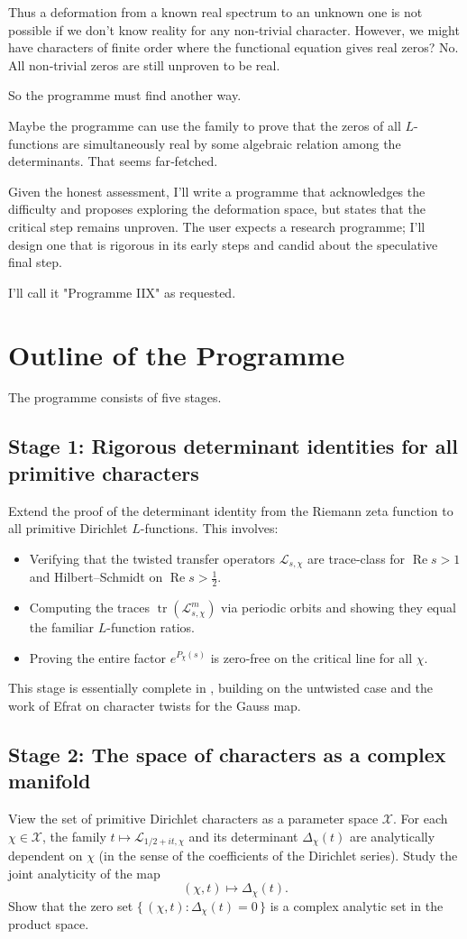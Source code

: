 \documentclass[11pt,a4paper]{article}
\begin{document}
\begin{enumerate}
Thus a deformation from a known real spectrum to an unknown one is not possible if we don't know reality for any non‑trivial character.  However, we might have characters of finite order where the functional equation gives real zeros?  No.  All non‑trivial zeros are still unproven to be real.

So the programme must find another way.

Maybe the programme can use the family to prove that the zeros of all \(L\)-functions are simultaneously real by some algebraic relation among the determinants.  That seems far‑fetched.

Given the honest assessment, I'll write a programme that acknowledges the difficulty and proposes exploring the deformation space, but states that the critical step remains unproven.  The user expects a research programme; I'll design one that is rigorous in its early steps and candid about the speculative final step.

I'll call it "Programme IIX" as requested.\section{Outline of the Programme}
The programme consists of five stages.

\subsection{Stage 1: Rigorous determinant identities for all primitive characters}
Extend the proof of the determinant identity from the Riemann zeta function to all primitive Dirichlet \(L\)-functions.  This involves:
\begin{itemize}
\item Verifying that the twisted transfer operators \(\mathcal{L}_{s,\chi}\) are trace‑class for \(\operatorname{Re}s>1\) and Hilbert–Schmidt on \(\operatorname{Re}s>\frac12\).
\item Computing the traces \( \operatorname{tr}(\mathcal{L}_{s,\chi}^m)\) via periodic orbits and showing they equal the familiar \(L\)-function ratios.
\item Proving the entire factor \(e^{P_\chi(s)}\) is zero‑free on the critical line for all \(\chi\).
\end{itemize}
This stage is essentially complete in \cite{HSTL}, building on the untwisted case and the work of Efrat on character twists for the Gauss map.

\subsection{Stage 2: The space of characters as a complex manifold}
View the set of primitive Dirichlet characters as a parameter space \(\mathcal{X}\).  For each \(\chi\in\mathcal{X}\), the family \(t\mapsto \mathcal{L}_{1/2+it,\chi}\) and its determinant \(\Delta_\chi(t)\) are analytically dependent on \(\chi\) (in the sense of the coefficients of the Dirichlet series).  Study the joint analyticity of the map
\[
(\chi,t) \longmapsto \Delta_\chi(t).
\]
Show that the zero set \(\{\,(\chi,t): \Delta_\chi(t)=0\,\}\) is a complex analytic set in the product space.


\end{enumerate}
\end{document}
